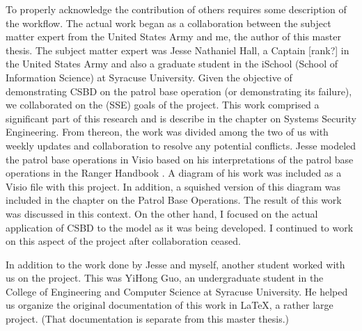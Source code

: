 \documentclass[../main/main.tex]{subfiles}
\begin{document}
To properly acknowledge the contribution of others requires some description of the workflow.  The actual work began as a collaboration between the subject matter expert from the United States Army and me, the author of this master thesis.  The subject matter expert was Jesse Nathaniel Hall, a Captain [rank?] in the United States Army and also a graduate student in the iSchool (School of Information Science) at Syracuse University. Given the objective of demonstrating CSBD on the patrol base operation (or demonstrating its failure), we collaborated on the  (SSE) goals of the project.  This work comprised a significant part of this research and is describe in the chapter on Systems Security Engineering.  From thereon, the work was divided among the two of us with weekly updates and collaboration to resolve any potential conflicts.   Jesse modeled the patrol base operations in Visio based on his interpretations of the patrol base operations in the Ranger Handbook \cite{rangermanual}.  A diagram of his work was included as a Visio file with this project.  In addition, a squished version of this diagram was included in the chapter on the Patrol Base Operations.  The result of this work was discussed in this context.   On the other hand, I focused on the actual application of CSBD to the model as it was being developed.  I continued to work on this aspect of the project after collaboration ceased.  

In addition to the work done by Jesse and myself, another student worked with us on the project.  This was YiHong Guo, an undergraduate student in the College of Engineering and Computer Science at Syracuse University. He helped us organize the original documentation of this work in LaTeX, a rather large project. (That documentation is separate from this master thesis.)
\end{document}

